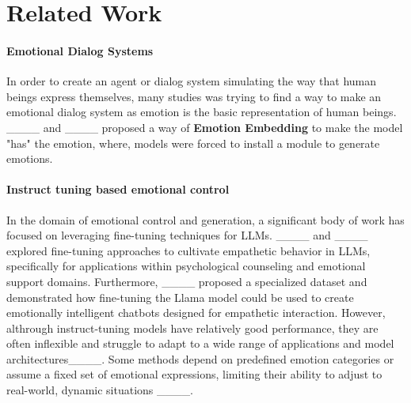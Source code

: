\section{Related Work}
\paragraph{Emotional Dialog Systems} In order to create an agent or dialog system simulating the way that human beings express themselves, many studies was trying to find a way to make an emotional dialog system as emotion is the basic representation of human beings. ____ and ____ proposed a way of \textbf{Emotion Embedding} to make the model "has" the emotion, where, models were forced to install a module to generate emotions. %

\paragraph{Instruct tuning based emotional control} In the domain of emotional control and generation, a significant body of work has focused on leveraging fine-tuning techniques for LLMs. ____ and ____ explored fine-tuning approaches to cultivate empathetic behavior in LLMs, specifically for applications within psychological counseling and emotional support domains. Furthermore, ____ proposed a specialized dataset and demonstrated how fine-tuning the Llama model could be used to create emotionally intelligent chatbots designed for empathetic interaction. However, althrough instruct-tuning models have relatively good performance, they are often inflexible and struggle to adapt to a wide range of applications and model architectures____. Some methods depend on predefined emotion categories or assume a fixed set of emotional expressions, limiting their ability to adjust to real-world, dynamic situations ____.


